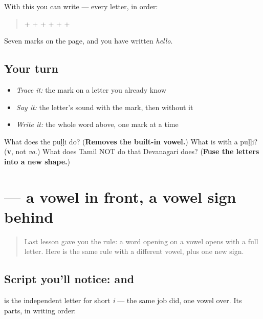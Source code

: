 With this you can write  — every letter, in order:

\begin{quote}
 +  +  +  +  +  + 
\end{quote}

Seven marks on the page, and you have written \emph{hello}.

\subsection*{Your turn}
\begin{itemize}
\raggedright
  \item \emph{Trace it:} the mark on a letter you already know
  \item \emph{Say it:} the letter's sound with the mark, then without it
  \item \emph{Write it:} the whole word above, one mark at a time
\end{itemize}

\begin{tcolorbox}[breakable,colback=teal!4,colframe=teal!35!black,title={Before you move on}]
What does the puḷḷi do? (\textbf{Removes the built-in vowel.}) What is  with a puḷḷi? (\textbf{v}, not \emph{va}.) What does Tamil NOT do that Devanagari does? (\textbf{Fuse the letters into a new shape.})
\end{tcolorbox}
\section[\texorpdfstring{\ta{இல்லை} (illai)}{இல்லை (illai)}]{ — a vowel in front, a vowel sign behind}

\label{lesson:TA-W06-write-illai}



\begin{quote}
Last lesson gave you the rule: a word opening on a vowel opens with a full letter. Here is the same rule with a different vowel, plus one new sign.
\end{quote}

\subsection*{Script you'll notice:  and }

\textbf{} is the independent letter for short \emph{i} — the same job \textbf{} did, one vowel over. Its parts, in writing order:

